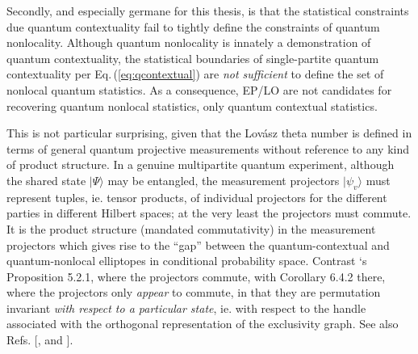 \documentclass[
  12pt          %
  ,letterpaper  %
  ,center       %
  ,noupper      %
  ,english,fleqn]{uconnthesis}
\newcommand{\ceq}[1]{Eq.\,(\ref{#1})}
\begin{document}

Secondly, and especially germane for this thesis, is that the statistical constraints due quantum contextuality fail to tightly define the constraints of quantum nonlocality. Although quantum nonlocality is innately a demonstration of quantum contextuality, the statistical boundaries of single-partite quantum contextuality per \ceq{eq:qcontextual} are {\em not sufficient} to define the set of nonlocal quantum statistics. As a consequence, EP/LO are {\em} not candidates for recovering quantum nonlocal statistics, only quantum contextual statistics.

This is not particular surprising, given that the  Lov{\'a}sz theta number is defined in terms of general quantum projective measurements without reference to any kind of product structure. In a genuine multipartite quantum experiment, although the shared state ${|\Psi\rangle}$ may be entangled, the measurement projectors ${|\psi_v\rangle}$ must represent tuples, ie. tensor products, of individual projectors for the different parties in different Hilbert spaces; at the very least the projectors must commute. It is the product structure (mandated commutativity) in the measurement projectors which gives rise to the ``gap'' between the quantum-contextual and quantum-nonlocal \glspl{elliptope} in conditional probability space. Contrast \citet{FritzCombinatorialLong}`s Proposition 5.2.1, where the projectors commute, with Corollary 6.4.2 there, where the projectors only \emph{appear} to commute, in that they are permutation invariant {\em with respect to a particular state}, ie. with respect to the handle associated with the orthogonal representation of the exclusivity graph. See also Refs. [\citealp{NonlocalityContextualityCommutativity}, and \citealp[Lemma 3]{AlmostQuantum2}]. 
\end{document}
